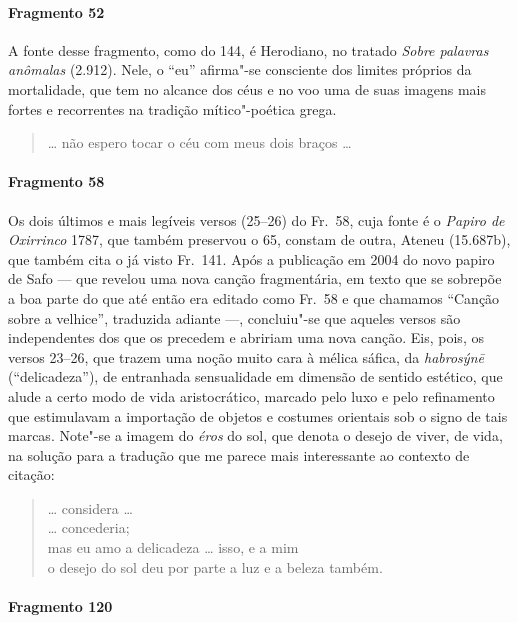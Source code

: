 {\paragraph{Fragmento 52}

{\small A fonte desse fragmento, como do 144, é Herodiano, no tratado \textit{Sobre
palavras anômalas} (2.912). Nele, o “eu” afirma"-se consciente dos limites próprios da
mortalidade, que tem no alcance dos céus e no voo uma de suas imagens mais
fortes e recorrentes na tradição mítico"-poética grega.}

\begin{verse}
\ldots{} não espero tocar o céu com meus dois braços \ldots{}
\end{verse}

\paragraph{Fragmento 58}

{\small Os dois últimos e mais legíveis versos (25--26) do Fr.~58, cuja fonte é o
\textit{Papiro de Oxirrinco }1787, que também preservou o 65, constam de outra, Ateneu (15.687b), que também cita o já visto Fr.~141. Após a publicação em 2004 do
novo papiro de Safo --- que revelou uma nova canção fragmentária, em texto que se
sobrepõe a boa parte do que até então era editado como Fr.~58 e que chamamos ``Canção sobre a velhice'', traduzida adiante ---, concluiu"-se que aqueles
versos são independentes dos que os precedem e abririam uma nova canção. Eis, pois, os versos 23--26, que
trazem uma noção muito cara à mélica sáfica, da \textit{habrosýnē}
(``delicadeza”), de entranhada sensualidade em dimensão de sentido
estético, que alude a certo modo de vida aristocrático, marcado pelo luxo e pelo
refinamento que estimulavam a importação de objetos e costumes orientais
sob o signo de tais marcas. Note"-se a imagem do \textit{éros} do sol, que denota o desejo de viver, de vida, na solução para a tradução que me parece mais interessante ao contexto de citação:}

\begin{verse}
\ldots{} considera \ldots{}\\
\ldots{} concederia;\\
mas eu amo a delicadeza \ldots{} isso, e a mim\\
o desejo do sol deu por parte a luz e a beleza \qb{}também.
\end{verse}

\paragraph{Fragmento 120}

}
